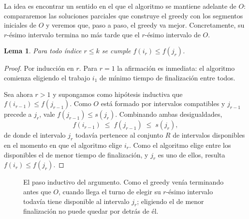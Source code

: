 \documentclass[12pt, spanish, oneside, openany]{book}
\theoremstyle{uprightplain}
\newtheorem{lema}[teorema]{Lema}
\theoremstyle{definition}
\theoremstyle{remark}
\theoremstyle{definition}
\begin{document}
La idea es encontrar un sentido en el que el algoritmo se mantiene adelante de $O$: compararemos las soluciones parciales que construye el greedy con los segmentos iniciales de $O$ y veremos que, paso a paso, el greedy va mejor. Concretamente, su $r$-ésimo intervalo termina no más tarde que el $r$-ésimo intervalo de $O$.

\begin{lema}
\label{lema:mantiene-adelante}
Para todo índice $r \le k$ se cumple $f(i_r) \le f(j_r)$.
\end{lema}
\begin{proof}
Por inducción en $r$. Para $r=1$ la afirmación es inmediata: el algoritmo comienza eligiendo el trabajo $i_1$ de mínimo tiempo de finalización entre todos.

Sea ahora $r>1$ y supongamos como hipótesis inductiva que $f(i_{r-1}) \le f(j_{r-1})$. Como $O$ está formado por intervalos compatibles y $j_{r-1}$ precede a $j_r$, vale $f(j_{r-1}) \le s(j_r)$. Combinando ambas desigualdades,
\[
f(i_{r-1}) \;\le\; f(j_{r-1}) \;\le\; s(j_r),
\]
de donde el intervalo $j_r$ todavía pertenece al conjunto $R$ de intervalos disponibles en el momento en que el algoritmo elige $i_r$. Como el algoritmo elige entre los disponibles el de menor tiempo de finalización, y $j_r$ es uno de ellos, resulta $f(i_r) \le f(j_r)$.
\end{proof}

\begin{figure}[H]
\centering
{}
\caption{El paso inductivo del argumento. Como el greedy venía terminando antes
que $O$, cuando llega el turno de elegir su $r$-ésimo intervalo todavía tiene
disponible al intervalo $j_r$; eligiendo el de menor finalización no puede
quedar por detrás de él.}
\label{fig:paso-inductivo}
\end{figure}
\end{document}
